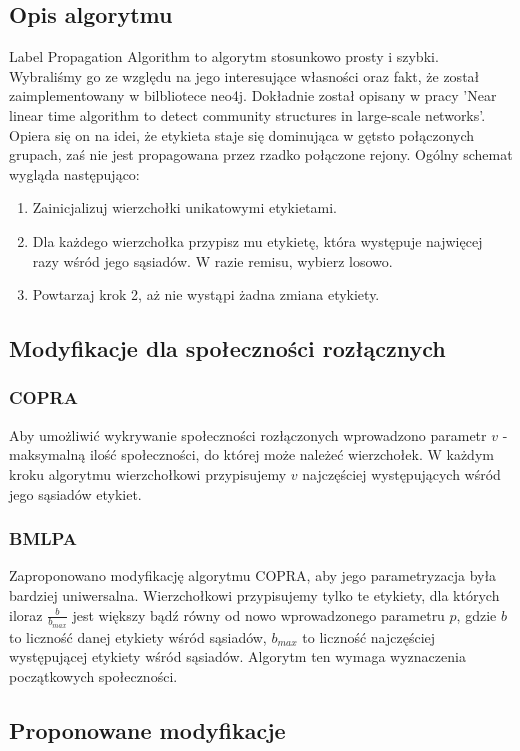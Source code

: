 \documentclass{article}
\begin{document}
\subsection{Opis algorytmu}
Label Propagation Algorithm to algorytm stosunkowo prosty i szybki. Wybraliśmy go ze względu na jego interesujące własności oraz fakt, że został zaimplementowany w bilbliotece neo4j. Dokładnie został opisany w pracy 'Near linear time algorithm to detect community structures in large-scale networks'\cite{ms-paper2}. Opiera się on na idei, że etykieta staje się dominująca w gętsto połączonych grupach, zaś nie jest propagowana przez rzadko połączone rejony. Ogólny schemat wygląda następująco:
\begin{enumerate}
\item Zainicjalizuj wierzchołki unikatowymi etykietami.
\item Dla każdego wierzchołka przypisz mu etykietę, która występuje najwięcej razy wśród jego sąsiadów. W razie remisu, wybierz losowo.
\item Powtarzaj krok 2, aż nie wystąpi żadna zmiana etykiety.
\end{enumerate}

\subsection{Modyfikacje dla społeczności rozłącznych}
\subsubsection{COPRA}
Aby umożliwić wykrywanie społeczności rozłączonych wprowadzono parametr $v$ - maksymalną ilość społeczności, do której może należeć wierzchołek\cite{ms-paper3}. W każdym kroku algorytmu wierzchołkowi przypisujemy $v$ najczęściej występujących wśród jego sąsiadów etykiet.
\subsubsection{BMLPA}
Zaproponowano modyfikację algorytmu COPRA, aby jego parametryzacja była bardziej uniwersalna\cite{ms-paper4}. Wierzchołkowi przypisujemy tylko te etykiety, dla których iloraz $\frac{b}{b_{max}}$ jest większy bądź równy od nowo wprowadzonego parametru $p$, gdzie $b$ to liczność danej etykiety wśród sąsiadów, $b_{max}$ to liczność najczęściej występującej etykiety wśród sąsiadów. Algorytm ten wymaga wyznaczenia początkowych społeczności.

\subsection{Proponowane modyfikacje}
\end{document}
